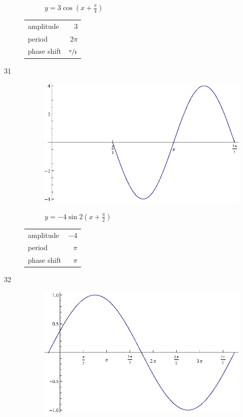 \documentclass{exam}
\begin{document}
\begin{description}
\begin{figure}[H]
          $y = 3 \cos \left( x + \frac{\pi}{4} \right)$
        \end{figure}

        \begin{tabular}[H]{lr}
          \toprule
          amplitude   & $3$ \\
          period      & $2 \pi$ \\
          phase shift & $\sfrac{\pi}{4}$ \\
          \bottomrule
        \end{tabular}

      \item[31]
        \begin{figure}[H]
          \centering
          \includegraphics[scale=0.8]{exercise31.eps}

          $y = -4 \sin 2 \left( x + \frac{\pi}{2} \right)$
        \end{figure}

        \begin{tabular}[H]{lr}
          \toprule
          amplitude   & $-4$ \\
          period      & $\pi$ \\
          phase shift & $\pi$ \\
          \bottomrule
        \end{tabular}

      \item[32]
        \begin{figure}[H]
          \centering
          \includegraphics[scale=0.8]{exercise32.eps}


\end{figure}
\end{description}
\end{document}
